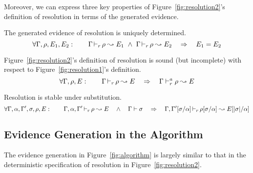 Moreover, we can express three key properties of Figure~\ref{fig:resolution2}'s
definition of resolution in terms of the generated evidence.
\begin{lemma}[Determinacy]
The generated evidence of resolution is uniquely determined.
\[\forall \Gamma, \rho, E_1, E_2: \quad\quad \Gamma \mathop{\vdash_{r}} \rho \leadsto E_1 ~\wedge~ \Gamma \mathop{\vdash_{r}} \rho \leadsto E_2 \quad\Rightarrow\quad E_1 = E_2 \]
\end{lemma}
\begin{lemma}[Soundness]
Figure~\ref{fig:resolution2}'s definition of resolution is sound (but
incomplete) with respect to Figure~\ref{fig:resolution1}'s definition.
\[\forall \Gamma, \rho, E: \quad\quad \Gamma \mathop{\vdash_{r}} \rho \leadsto E \quad\Rightarrow\quad \Gamma \vdash^a_{r} \rho \leadsto E \]
\end{lemma}
\begin{lemma}[Coherence]
Resolution is stable under substitution.
\[\forall \Gamma,\alpha,\Gamma',\sigma,\rho, E: \quad\quad 
\Gamma,\alpha,\Gamma' \mathop{\vdash_{r}} \rho \leadsto E \quad\wedge\quad \Gamma \vdash \sigma
\quad\Rightarrow\quad 
\Gamma,\Gamma'[\sigma/\alpha] \mathop{\vdash_{r}} \rho[\sigma/\alpha] \leadsto E[|\sigma|/\alpha] \]
\end{lemma}

\subsection{Evidence Generation in the Algorithm}

The evidence generation in Figure~\ref{fig:algorithm} is largely similar to
that in the deterministic specification of resolution in
Figure~\ref{fig:resolution2}.

% 


